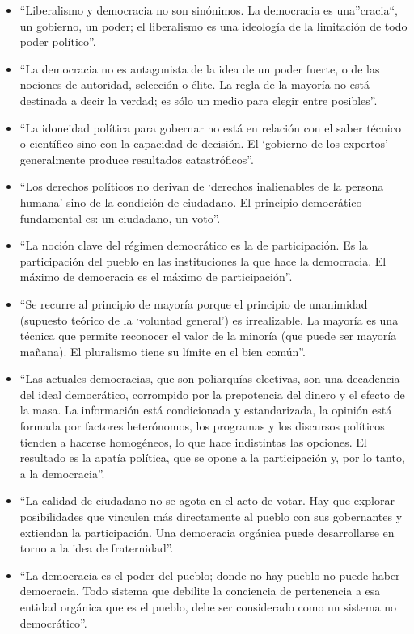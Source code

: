 \documentclass[
]{book}
\begin{document}
\begin{itemize}
\item
  ``Liberalismo y democracia no son sinónimos. La democracia es una''cracia``, un gobierno, un poder; el liberalismo es una ideología de la limitación de todo poder político''.
\item
  ``La democracia no es antagonista de la idea de un poder fuerte, o de las nociones de autoridad, selección o élite. La regla de la mayoría no está destinada a decir la verdad; es sólo un medio para elegir entre posibles''.
\item
  ``La idoneidad política para gobernar no está en relación con el saber técnico o científico sino con la capacidad de decisión. El `gobierno de los expertos' generalmente produce resultados catastróficos''.
\item
  ``Los derechos políticos no derivan de `derechos inalienables de la persona humana' sino de la condición de ciudadano. El principio democrático fundamental es: un ciudadano, un voto''.
\item
  ``La noción clave del régimen democrático es la de participación. Es la participación del pueblo en las instituciones la que hace la democracia. El máximo de democracia es el máximo de participación''.
\item
  ``Se recurre al principio de mayoría porque el principio de unanimidad (supuesto teórico de la `voluntad general') es irrealizable. La mayoría es una técnica que permite reconocer el valor de la minoría (que puede ser mayoría mañana). El pluralismo tiene su límite en el bien común''.
\item
  ``Las actuales democracias, que son poliarquías electivas, son una decadencia del ideal democrático, corrompido por la prepotencia del dinero y el efecto de la masa. La información está condicionada y estandarizada, la opinión está formada por factores heterónomos, los programas y los discursos políticos tienden a hacerse homogéneos, lo que hace indistintas las opciones. El resultado es la apatía política, que se opone a la participación y, por lo tanto, a la democracia''.
\item
  ``La calidad de ciudadano no se agota en el acto de votar. Hay que explorar posibilidades que vinculen más directamente al pueblo con sus gobernantes y extiendan la participación. Una democracia orgánica puede desarrollarse en torno a la idea de fraternidad''.
\item
  ``La democracia es el poder del pueblo; donde no hay pueblo no puede haber democracia. Todo sistema que debilite la conciencia de pertenencia a esa entidad orgánica que es el pueblo, debe ser considerado como un sistema no democrático''.
\end{itemize}
\end{document}
